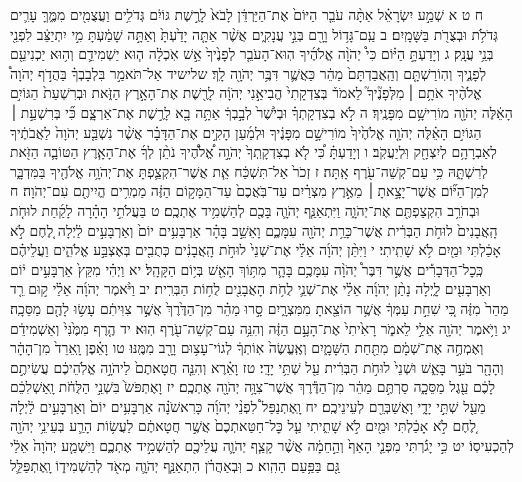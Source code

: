 \documentclass[twoside, openany, parskip=half, 11pt]{book}
\begin{document}
ח ט א שְׁמַ֣ע יִשְׂרָאֵ֗ל אַתָּ֨ה עֹבֵ֤ר הַיּוֹם֙ אֶת־הַיַּרְדֵּ֔ן לָבֹא֙ לָרֶ֣שֶׁת גּוֹיִ֔ם גְּדֹלִ֥ים וַעֲצֻמִ֖ים מִמֶּ֑ךָּ עָרִ֛ים גְּדֹלֹ֥ת וּבְצֻרֹ֖ת בַּשָּׁמָֽיִם׃ ב עַֽם־גָּד֥וֹל וָרָ֖ם בְּנֵ֣י עֲנָקִ֑ים אֲשֶׁ֨ר אַתָּ֤ה יָדַ֙עְתָּ֙ וְאַתָּ֣ה שָׁמַ֔עְתָּ מִ֣י יִתְיַצֵּ֔ב לִפְנֵ֖י בְּנֵ֥י עֲנָֽק׃ ג וְיָדַעְתָּ֣ הַיּ֗וֹם כִּי֩ יְהֹוָ֨ה אֱלֹהֶ֜יךָ הֽוּא־הָעֹבֵ֤ר לְפָנֶ֙יךָ֙ אֵ֣שׁ אֹֽכְלָ֔ה ה֧וּא יַשְׁמִידֵ֛ם וְה֥וּא יַכְנִיעֵ֖ם לְפָנֶ֑יךָ וְהֽוֹרַשְׁתָּ֤ם וְהַֽאֲבַדְתָּם֙ מַהֵ֔ר כַּאֲשֶׁ֛ר דִּבֶּ֥ר יְהֹוָ֖ה לָֽךְ׃ שלישיד אַל־תֹּאמַ֣ר בִּלְבָבְךָ֗ בַּהֲדֹ֣ף יְהֹוָה֩ אֱלֹהֶ֨יךָ אֹתָ֥ם ׀ מִלְּפָנֶ֘יךָ֮ לֵאמֹר֒ בְּצִדְקָתִי֙ הֱבִיאַ֣נִי יְהֹוָ֔ה לָרֶ֖שֶׁת אֶת־הָאָ֣רֶץ הַזֹּ֑את וּבְרִשְׁעַת֙ הַגּוֹיִ֣ם הָאֵ֔לֶּה יְהֹוָ֖ה מוֹרִישָׁ֥ם מִפָּנֶֽיךָ׃ ה לֹ֣א בְצִדְקָתְךָ֗ וּבְיֹ֙שֶׁר֙ לְבָ֣בְךָ֔ אַתָּ֥ה בָ֖א לָרֶ֣שֶׁת אֶת־אַרְצָ֑ם כִּ֞י בְּרִשְׁעַ֣ת ׀ הַגּוֹיִ֣ם הָאֵ֗לֶּה יְהֹוָ֤ה אֱלֹהֶ֙יךָ֙ מוֹרִישָׁ֣ם מִפָּנֶ֔יךָ וּלְמַ֜עַן הָקִ֣ים אֶת־הַדָּבָ֗ר אֲשֶׁ֨ר נִשְׁבַּ֤ע יְהֹוָה֙ לַאֲבֹתֶ֔יךָ לְאַבְרָהָ֥ם לְיִצְחָ֖ק וּֽלְיַעֲקֹֽב׃ ו וְיָדַעְתָּ֗ כִּ֠י לֹ֤א בְצִדְקָֽתְךָ֙ יְהֹוָ֣ה אֱ֠לֹהֶ֠יךָ נֹתֵ֨ן לְךָ֜ אֶת־הָאָ֧רֶץ הַטּוֹבָ֛ה הַזֹּ֖את לְרִשְׁתָּ֑הּ כִּ֥י עַם־קְשֵׁה־עֹ֖רֶף אָֽתָּה׃ ז זְכֹר֙ אַל־תִּשְׁכַּ֔ח אֵ֧ת אֲשֶׁר־הִקְצַ֛פְתָּ אֶת־יְהֹוָ֥ה אֱלֹהֶ֖יךָ בַּמִּדְבָּ֑ר לְמִן־הַיּ֞וֹם אֲשֶׁר־יָצָ֣אתָ ׀ מֵאֶ֣רֶץ מִצְרַ֗יִם עַד־בֹּֽאֲכֶם֙ עַד־הַמָּק֣וֹם הַזֶּ֔ה מַמְרִ֥ים הֱיִיתֶ֖ם עִם־יְהֹוָה׃ ח וּבְחֹרֵ֥ב הִקְצַפְתֶּ֖ם אֶת־יְהֹוָ֑ה וַיִּתְאַנַּ֧ף יְהֹוָ֛ה בָּכֶ֖ם לְהַשְׁמִ֥יד אֶתְכֶֽם׃ ט בַּעֲלֹתִ֣י הָהָ֗רָה לָקַ֜חַת לוּחֹ֤ת הָֽאֲבָנִים֙ לוּחֹ֣ת הַבְּרִ֔ית אֲשֶׁר־כָּרַ֥ת יְהֹוָ֖ה עִמָּכֶ֑ם וָאֵשֵׁ֣ב בָּהָ֗ר אַרְבָּעִ֥ים יוֹם֙ וְאַרְבָּעִ֣ים לַ֔יְלָה לֶ֚חֶם לֹ֣א אָכַ֔לְתִּי וּמַ֖יִם לֹ֥א שָׁתִֽיתִי׃ י וַיִּתֵּ֨ן יְהֹוָ֜ה אֵלַ֗י אֶת־שְׁנֵי֙ לוּחֹ֣ת הָֽאֲבָנִ֔ים כְּתֻבִ֖ים בְּאֶצְבַּ֣ע אֱלֹהִ֑ים וַעֲלֵיהֶ֗ם כְּֽכׇל־הַדְּבָרִ֡ים אֲשֶׁ֣ר דִּבֶּר֩ יְהֹוָ֨ה עִמָּכֶ֥ם בָּהָ֛ר מִתּ֥וֹךְ הָאֵ֖שׁ בְּי֥וֹם הַקָּהָֽל׃ יא וַיְהִ֗י מִקֵּץ֙ אַרְבָּעִ֣ים י֔וֹם וְאַרְבָּעִ֖ים לָ֑יְלָה נָתַ֨ן יְהֹוָ֜ה אֵלַ֗י אֶת־שְׁנֵ֛י לֻחֹ֥ת הָאֲבָנִ֖ים לֻח֥וֹת הַבְּרִֽית׃ יב וַיֹּ֨אמֶר יְהֹוָ֜ה אֵלַ֗י ק֣וּם רֵ֤ד מַהֵר֙ מִזֶּ֔ה כִּ֚י שִׁחֵ֣ת עַמְּךָ֔ אֲשֶׁ֥ר הוֹצֵ֖אתָ מִמִּצְרָ֑יִם סָ֣רוּ מַהֵ֗ר מִן־הַדֶּ֙רֶךְ֙ אֲשֶׁ֣ר צִוִּיתִ֔ם עָשׂ֥וּ לָהֶ֖ם מַסֵּכָֽה׃ יג וַיֹּ֥אמֶר יְהֹוָ֖ה אֵלַ֣י לֵאמֹ֑ר רָאִ֙יתִי֙ אֶת־הָעָ֣ם הַזֶּ֔ה וְהִנֵּ֥ה עַם־קְשֵׁה־עֹ֖רֶף הֽוּא׃ יד הֶ֤רֶף מִמֶּ֙נִּי֙ וְאַשְׁמִידֵ֔ם וְאֶמְחֶ֣ה אֶת־שְׁמָ֔ם מִתַּ֖חַת הַשָּׁמָ֑יִם וְאֶֽעֱשֶׂה֙ אֽוֹתְךָ֔ לְגוֹי־עָצ֥וּם וָרָ֖ב מִמֶּֽנּוּ׃ טו וָאֵ֗פֶן וָֽאֵרֵד֙ מִן־הָהָ֔ר וְהָהָ֖ר בֹּעֵ֣ר בָּאֵ֑שׁ וּשְׁנֵי֙ לוּחֹ֣ת הַבְּרִ֔ית עַ֖ל שְׁתֵּ֥י יָדָֽי׃ טז וָאֵ֗רֶא וְהִנֵּ֤ה חֲטָאתֶם֙ לַיהֹוָ֣ה אֱלֹֽהֵיכֶ֔ם עֲשִׂיתֶ֣ם לָכֶ֔ם עֵ֖גֶל מַסֵּכָ֑ה סַרְתֶּ֣ם מַהֵ֔ר מִן־הַדֶּ֕רֶךְ אֲשֶׁר־צִוָּ֥ה יְהֹוָ֖ה אֶתְכֶֽם׃ יז וָאֶתְפֹּשׂ֙ בִּשְׁנֵ֣י הַלֻּחֹ֔ת וָֽאַשְׁלִכֵ֔ם מֵעַ֖ל שְׁתֵּ֣י יָדָ֑י וָאֲשַׁבְּרֵ֖ם לְעֵינֵיכֶֽם׃ יח וָֽאֶתְנַפַּל֩ לִפְנֵ֨י יְהֹוָ֜ה כָּרִאשֹׁנָ֗ה אַרְבָּעִ֥ים יוֹם֙ וְאַרְבָּעִ֣ים לַ֔יְלָה לֶ֚חֶם לֹ֣א אָכַ֔לְתִּי וּמַ֖יִם לֹ֣א שָׁתִ֑יתִי עַ֤ל כׇּל־חַטַּאתְכֶם֙ אֲשֶׁ֣ר חֲטָאתֶ֔ם לַעֲשׂ֥וֹת הָרַ֛ע בְּעֵינֵ֥י יְהֹוָ֖ה לְהַכְעִיסֽוֹ׃ יט כִּ֣י יָגֹ֗רְתִּי מִפְּנֵ֤י הָאַף֙ וְהַ֣חֵמָ֔ה אֲשֶׁ֨ר קָצַ֧ף יְהֹוָ֛ה עֲלֵיכֶ֖ם לְהַשְׁמִ֣יד אֶתְכֶ֑ם וַיִּשְׁמַ֤ע יְהֹוָה֙ אֵלַ֔י גַּ֖ם בַּפַּ֥עַם הַהִֽוא׃ כ וּֽבְאַהֲרֹ֗ן הִתְאַנַּ֧ף יְהֹוָ֛ה מְאֹ֖ד לְהַשְׁמִיד֑וֹ וָֽאֶתְפַּלֵּ֛ל 
\end{document}
